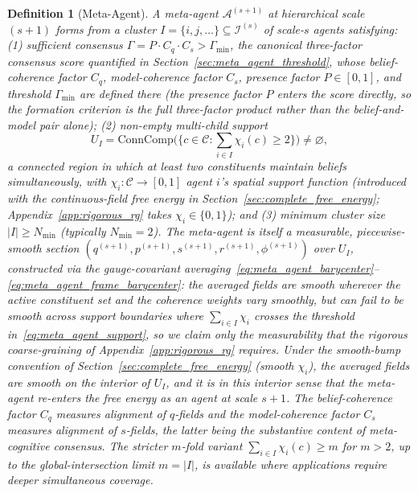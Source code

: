 \documentclass[11pt]{article}
\newtheorem{definition}{Definition}
\begin{document}
\begin{definition}[Meta-Agent]
A meta-agent $\mathcal{A}^{(s+1)}$ at hierarchical scale $(s+1)$ forms from a cluster $I = \{i, j, \ldots\} \subseteq \mathcal{I}^{(s)}$ of scale-$s$ agents satisfying: (1) sufficient consensus $\Gamma = P \cdot C_q \cdot C_s > \Gamma_{\min}$, the canonical three-factor consensus score quantified in Section~\ref{sec:meta_agent_threshold}, whose belief-coherence factor $C_q$, model-coherence factor $C_s$, presence factor $P \in [0, 1]$, and threshold $\Gamma_{\min}$ are defined there (the presence factor $P$ enters the score directly, so the formation criterion is the full three-factor product rather than the belief-and-model pair alone); (2) non-empty multi-child support
\begin{equation}
U_I = \mathrm{ConnComp}\Big(\big\{c \in \mathcal{C}: \textstyle\sum_{i \in I} \chi_i(c) \ge 2\big\}\Big) \neq \varnothing,
\label{eq:meta_agent_support}
\end{equation}
a connected region in which at least two constituents maintain beliefs simultaneously, with $\chi_i: \mathcal{C} \to [0, 1]$ agent $i$'s spatial support function (introduced with the continuous-field free energy in Section~\ref{sec:complete_free_energy}; Appendix~\ref{app:rigorous_rg} takes $\chi_i \in \{0, 1\}$); and (3) minimum cluster size $|I| \geq N_{\min}$ (typically $N_{\min} = 2$). The meta-agent is itself a measurable, piecewise-smooth section $(q^{(s+1)}, p^{(s+1)}, s^{(s+1)}, r^{(s+1)}, \phi^{(s+1)})$ over $U_I$, constructed via the gauge-covariant averaging~\eqref{eq:meta_agent_barycenter}--\eqref{eq:meta_agent_frame_barycenter}: the averaged fields are smooth wherever the active constituent set and the coherence weights vary smoothly, but can fail to be smooth across support boundaries where $\sum_{i \in I}\chi_i$ crosses the threshold in~\eqref{eq:meta_agent_support}, so we claim only the measurability that the rigorous coarse-graining of Appendix~\ref{app:rigorous_rg} requires. Under the smooth-bump convention of Section~\ref{sec:complete_free_energy} (smooth $\chi_i$), the averaged fields are smooth on the interior of $U_I$, and it is in this interior sense that the meta-agent re-enters the free energy as an agent at scale $s+1$. The belief-coherence factor $C_q$ measures alignment of $q$-fields and the model-coherence factor $C_s$ measures alignment of $s$-fields, the latter being the substantive content of meta-cognitive consensus. The stricter $m$-fold variant $\sum_{i \in I}\chi_i(c) \ge m$ for $m > 2$, up to the global-intersection limit $m = |I|$, is available where applications require deeper simultaneous coverage.
\end{definition}
\end{document}
